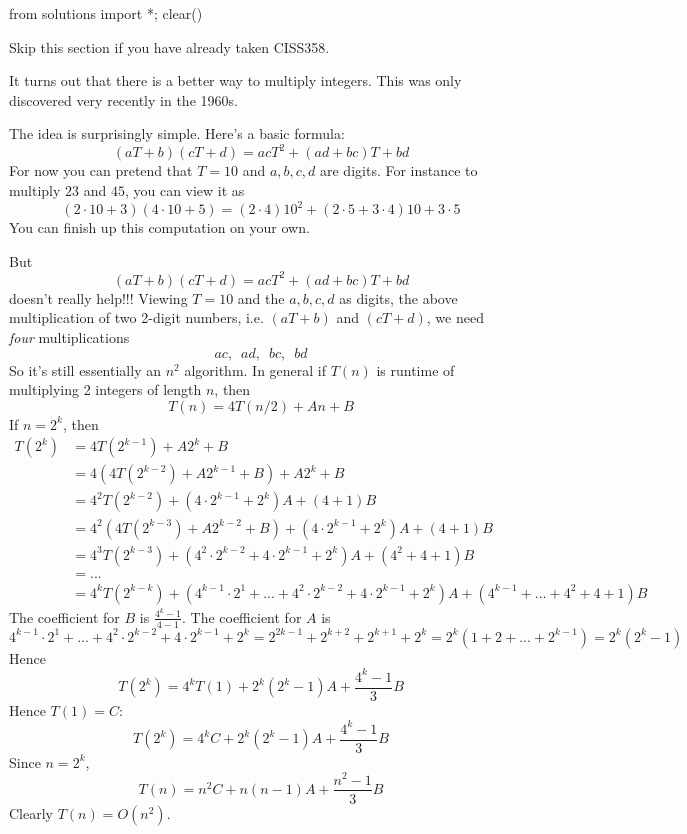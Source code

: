 \begin{python0}
from solutions import *; clear()
\end{python0}

Skip this section if you have already taken CISS358.

It turns out that there is a better way to multiply integers.
This was only discovered very recently in the 1960s. 

The idea is surprisingly simple.
Here's a basic formula:
\[
(aT + b)(cT + d) = acT^2 + (ad + bc)T + bd
\]
For now you can pretend that $T = 10$ and $a,b,c,d$ are digits.
For instance to multiply $23$ and $45$, you can view it as
\[
(2 \cdot 10 + 3)(4 \cdot 10 + 5)
= (2 \cdot 4) 10^2 + (2 \cdot 5 + 3 \cdot 4) 10 + 3 \cdot 5
\]
You can finish up this computation on your own.

But 
\[
(aT + b)(cT + d) = acT^2 + (ad + bc)T + bd
\]
doesn't really help!!!
Viewing $T = 10$ and the $a,b,c,d$ as digits, the above
multiplication of two 2-digit numbers, i.e. 
$(aT + b)$ and $(cT + d)$, we need
\textit{ four} multiplications
\[
ac, \,\,\, 
ad, \,\,\,
bc, \,\,\,
bd
\]
So it's still essentially an $n^2$ algorithm.
In general if $T(n)$ is runtime of multiplying 2 integers of length $n$,
then
\[
T(n) = 4T(n/2) + An + B
\]
If $n = 2^k$, then
\begin{align*}
T(2^k) &= 4T(2^{k-1}) + A2^k + B \\
&= 4(4T(2^{k-2}) + A2^{k-1} + B) + A2^k + B \\
&= 4^2T(2^{k-2}) + (4 \cdot 2^{k-1} + 2^k)A + (4 + 1) B \\
&= 4^2(4T(2^{k-3}) + A2^{k-2} + B) + (4 \cdot 2^{k-1} + 2^k)A + (4 + 1)B \\
&= 4^3T(2^{k-3}) + (4^2 \cdot 2^{k-2} + 4 \cdot 2^{k-1} + 2^k)A + (4^2 + 4 + 1)B \\
&= ... \\
&= 4^kT(2^{k-k}) + (4^{k-1} \cdot 2^{1} + ... + 4^2 \cdot 2^{k-2} + 4 \cdot 2^{k-1} + 2^k)A + (4^{k-1} + ... + 4^2 + 4 + 1)B
\end{align*}
The coefficient for $B$ is $\displaystyle \frac{4^k - 1}{4 - 1}$.
The coefficient for $A$ is
\[
4^{k-1} \cdot 2^{1} + ... + 4^2 \cdot 2^{k-2} + 4 \cdot 2^{k-1} + 2^k
=
2^{2k - 1}
+ 2^{k + 2}
+ 2^{k + 1}
+ 2^k
= 2^k(1 + 2 + ... + 2^{k-1})
= 2^k(2^k - 1)
\]
Hence
\[
T(2^k) = 4^k T(1) + 2^k(2^k - 1) A + \frac{4^k - 1}{3} B
\]
Hence $T(1) = C$:
\[
T(2^k) = 4^k C + 2^k(2^k - 1) A + \frac{4^k - 1}{3} B
\]
Since $n = 2^k$,
\[
T(n) = n^2 C + n(n - 1) A + \frac{n^2 - 1}{3} B
\]
Clearly $T(n) = O(n^2)$.

